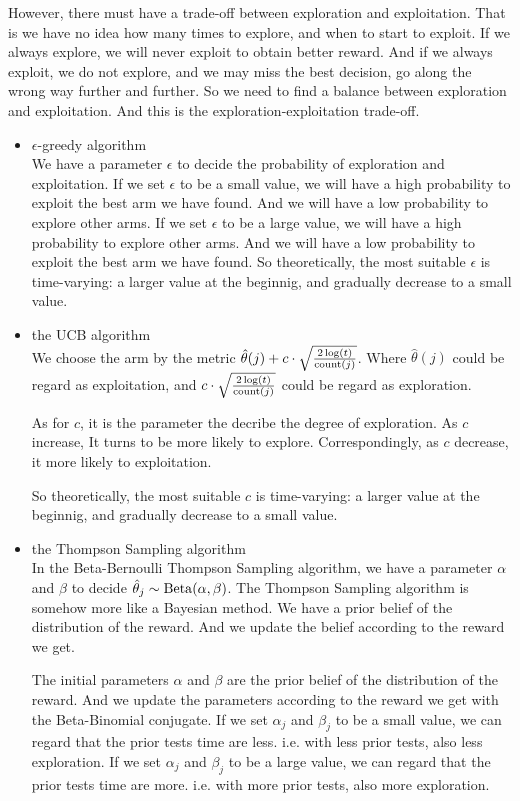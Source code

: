 However, there must have a trade-off between exploration and exploitation. That is we have no idea how many times to explore, and when to start to exploit. If we always explore, we will never exploit to obtain better reward. And if we always exploit, we do not explore, and we may miss the best decision, go along the wrong way further and further. So we need to find a balance between exploration and exploitation. And this is the exploration-exploitation trade-off.
\begin{itemize}
\item $\epsilon$-greedy algorithm \\
We have a parameter $\epsilon$ to decide the probability of exploration and exploitation. If we set $\epsilon$ to be a small value, we will have a high probability to exploit the best arm we have found. And we will have a low probability to explore other arms. If we set $\epsilon$ to be a large value, we will have a high probability to explore other arms. And we will have a low probability to exploit the best arm we have found. So theoretically, the most suitable $\epsilon$ is time-varying: a larger value at the beginnig, and gradually decrease to a small value.

\item the UCB algorithm \\
We choose the arm by the metric $\hat{\theta}(j)+c\cdot \sqrt{\frac{2\log(t)}{\text{count}(j)}}$. Where $\hat{\theta}(j)$ could be regard as exploitation, and $c\cdot \sqrt{\frac{2\log(t)}{\text{count}(j)}}$ could be regard as exploration.

As for $c$, it is the parameter the decribe the degree of exploration. As $c$ increase, It turns to be more likely to explore. Correspondingly, as $c$ decrease, it more likely to exploitation.

So theoretically, the most suitable $c$ is time-varying: a larger value at the beginnig, and gradually decrease to a small value.

\item the Thompson Sampling algorithm \\
In the Beta-Bernoulli Thompson Sampling algorithm, we have a parameter $\alpha$ and $\beta$ to decide $\hat{\theta}_j\sim \operatorname{Beta}(\alpha,\beta)$. The Thompson Sampling algorithm is somehow more like a Bayesian method. We have a prior belief of the distribution of the reward. And we update the belief according to the reward we get.

The initial parameters $\alpha$ and $\beta$ are the prior belief of the distribution of the reward. And we update the parameters according to the reward we get with the Beta-Binomial conjugate. If we set $\alpha_j$ and $\beta_j$ to be a small value, we can regard that the prior tests time are less. i.e. with less prior tests, also less exploration. If we set $\alpha_j$ and $\beta_j$ to be a large value, we can regard that the prior tests time are more. i.e. with more prior tests, also more exploration.


\end{itemize}

